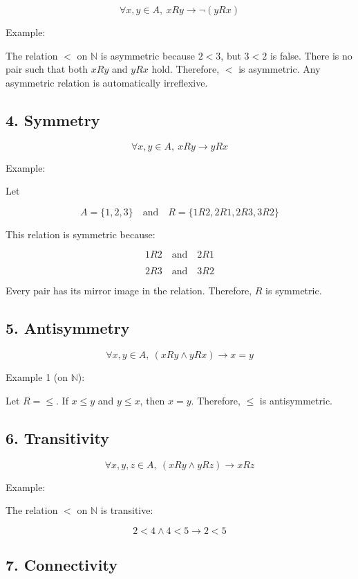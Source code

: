 \[\forall x,y \in A,\ xRy \to \neg(yRx)\]

Example:

The relation \(<\) on \(\mathbb{N}\) is asymmetric because \(2 < 3\),
but \(3 < 2\) is false. There is no pair such that both \(xRy\) and
\(yRx\) hold. Therefore, \(<\) is asymmetric. Any asymmetric relation is
automatically irreflexive.

\subsection{4. Symmetry}\label{symmetry}

\[\forall x,y \in A, \ xRy \to yRx\]

Example:

Let

\[A = \{1,2,3\} \quad \text{and} \quad R = \{1R2, 2R1, 2R3, 3R2\}\]

This relation is symmetric because:

\[1R2  \quad \text{and} \quad 2R1\]

\[2R3 \quad \text{and} \quad 3R2\]

Every pair has its mirror image in the relation. Therefore, \(R\) is
symmetric.

\subsection{5. Antisymmetry}\label{antisymmetry}

\[\forall x,y \in A,\ (xRy \land yRx) \to x = y\]

Example 1 (on \(\mathbb{N}\)):

Let \(R = \leq\). If \(x \leq y\) and \(y \leq x\), then \(x = y\).
Therefore, \(\leq\) is antisymmetric.

\subsection{6. Transitivity}\label{transitivity}

\[\forall x,y,z \in A,\ (xRy \land yRz) \to xRz\]

Example:

The relation \(<\) on \(\mathbb{N}\) is transitive:

\[2 < 4 \land 4 < 5 \to 2 < 5\]

\subsection{7. Connectivity}\label{connectivity}


